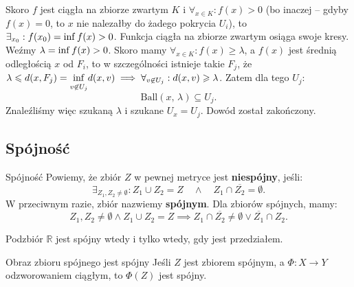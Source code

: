 \documentclass{article}
\numberwithin{defi}{section}
\numberwithin{defi}{section}
\newcommand{\R}{\mathbb{R}}
\newcommand{\se}{\subseteq}
\renewcommand{\inf}{\mathop{\mathrm{inf}\vphantom{\mathrm{sup}}}}
\providecommand{\ol}{\overline}
\renewcommand{\geq}{\geqslant}
\renewcommand{\leq}{\leqslant}
\newcommand{\ball}[2]{\text{Ball}(#1, \, #2)}
\begin{document}
\begin{dow}
\begin{itemize}
        Skoro $f$ jest ciągła na zbiorze zwartym $K$ i $\forall_{x \in K}: f(x) > 0$ (bo inaczej -- gdyby $f(x) = 0$, to $x$ nie nalezałby do żadego pokrycia $U_i$), to $\exists_{x_0}: f(x_0) = \inf f(x) >0$. Funkcja ciągła na zbiorze zwartym osiąga swoje kresy. Weźmy $\lambda = \inf f(x) > 0$. Skoro mamy $\forall_{x \in K}: f(x) \geq \lambda$, a $f(x)$ jest średnią odległością $x$ od $F_i$, to w szczególności istnieje takie $F_j$, że $\lambda \leq d(x, F_j) = \mathlarger{\inf}_{v \not \in U_j}d(x, v)  \implies \forall_{v \not \in U_j}: d(x, v) \geq \lambda$.  Zatem dla tego $U_j$:\begin{equation*}
            \ball{x}{\lambda} \se U_j.
        \end{equation*} Znaleźliśmy więc szukaną $\lambda$ i szukane $U_x = U_j$. Dowód został zakończony.
    \end{itemize}
\end{dow}


\subsection{Spójność}

\begin{defr}{Spójność}
    Powiemy, że zbiór $Z$ w pewnej metryce jest \textbf{niespójny}, jeśli:\begin{equation}
        \exists_{Z_1, Z_2 \neq \emptyset}: Z_1 \cup Z_2 = Z \quad \wedge \quad  Z_1 \cap \ol{Z_2} = \emptyset.
    \end{equation} W przeciwnym razie, zbiór nazwiemy \textbf{spójnym}. Dla zbiorów spójnych, mamy: \begin{equation*}
        Z_1, Z_2 \neq \emptyset \wedge Z_1 \cup Z_2 = Z \implies Z_1 \cap \ol{Z_2} \neq \emptyset \vee \ol{Z_1} \cap Z_2.
    \end{equation*}
\end{defr}

\begin{obs}{}
    Podzbiór $\R$ jest spójny wtedy i tylko wtedy, gdy jest przedziałem.
\end{obs}



\begin{twier}{Obraz zbioru spójnego jest spójny}
    Jeśli $Z$ jest zbiorem spójnym, a $\Phi: X \to Y$ odzworowaniem ciągłym, to $\Phi(Z)$ jest spójny.
\end{twier}
\end{document}

